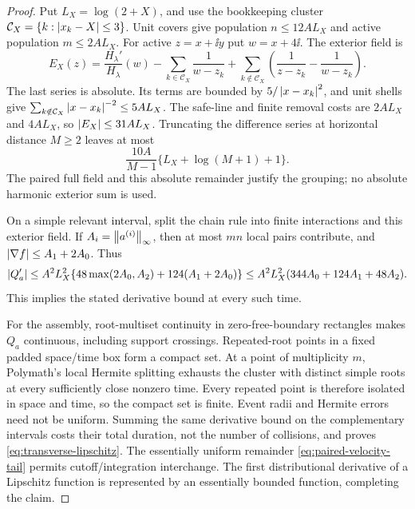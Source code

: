 \begin{proof}
Put \(L_X=\log(2+X)\), and use the bookkeeping cluster
\(\mathcal C_X=\{k:\left|x_k-X\right|\le3\}\). Unit covers give population
\(n\le12AL_X\) and active population \(m\le2AL_X\).
For active \(z=x+\ii y\) put \(w=x+4\ii\). The exterior field is
\begin{equation}\label{eq:safe-line-exterior}
 E_X(z)=\frac{H_\lambda'}{H_\lambda}(w)
       -\sum_{k\in\mathcal C_X}\frac1{w-z_k}
       +\sum_{k\notin\mathcal C_X}
          \left(\frac1{z-z_k}-\frac1{w-z_k}\right).
\end{equation}
The last series is absolute. Its terms are bounded by
\(5/\left|x-x_k\right|^2\), and unit shells give
\(\sum_{k\notin\mathcal C_X}\left|x-x_k\right|^{-2}\le5AL_X\).
The safe-line and finite removal costs are \(2AL_X\) and \(4AL_X\),
so \(\left|E_X\right|\le31AL_X\). Truncating the difference series at
horizontal distance \(M\ge2\) leaves at most
\[
 \frac{10A}{M-1}\{L_X+\log(M+1)+1\}.
\]
The paired full field and this absolute remainder justify the grouping;
no absolute harmonic exterior sum is used.

On a simple relevant interval, split the chain rule into finite
interactions and this exterior field. If \(A_i=\left\lVert a^{(i)}\right\rVert_\infty\),
then at most \(mn\) local pairs contribute, and
\(\left|\nabla f\right|\le A_1+2A_0\). Thus
\[
 \left|Q_a'\right|\le A^2L_X^2
 \{48\max(2A_0,A_2)+124(A_1+2A_0)\}
 \le A^2L_X^2(344A_0+124A_1+48A_2).
\]
This implies the stated derivative bound at every such time.

For the assembly, root-multiset continuity in zero-free-boundary
rectangles makes \(Q_a\) continuous, including support crossings.
Repeated-root points in a fixed padded space/time box form a compact
set. At a point of multiplicity \(m\), Polymath's local Hermite
splitting exhausts the cluster with distinct simple roots at every
sufficiently close nonzero time. Every repeated point is therefore
isolated in space and time, so the compact set is finite. Event radii
and Hermite errors need not be uniform. Summing the same derivative
bound on the complementary intervals costs their total duration, not
the number of collisions, and proves \eqref{eq:transverse-lipschitz}.
The essentially uniform remainder \eqref{eq:paired-velocity-tail}
permits cutoff/integration interchange. The first distributional derivative of a Lipschitz function is
represented by an essentially bounded function, completing the claim.
\end{proof}

